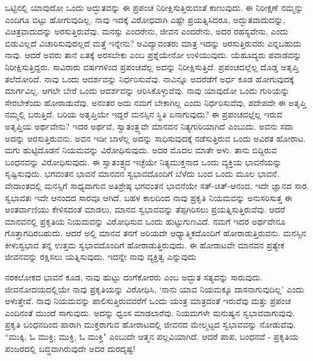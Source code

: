 ಒಟ್ಟಿನಲ್ಲಿ ಯಾವುದೋ ಒಂದು ಅದ್ಭುತವನ್ನು ಈ ಪ್ರಪಂಚ ನಿರೀಕ್ಷಿಸುತ್ತಿರುವಂತೆ ಕಾಣುವುದು. ಈ ನಿರೀಕ್ಷಣೆ ನಮ್ಮನ್ನು ಎಂದಿಗೂ ಬಿಟ್ಟು ಹೋಗುವುದಿಲ್ಲ. ನಾವು ಇದಕ್ಕೆ ವಿರೋಧವಾಗಿ ಎಷ್ಟೇ ಪ್ರಯತ್ನಿಸಿದರೂ, ಅದ್ಭುತವಾದುದನ್ನು, ವಿಚಿತ್ರವಾದುದನ್ನು ಅರಸುತ್ತಿರುವೆವು. ಮನಸ್ಸು ಎಂದರೇನು, ಜೀವನ ಎಂದರೇನು, ಅದರ ರಹಸ್ಯವೇನು, ಎಂದು ಬಿಡುವಿಲ್ಲದೆ ವಿಚಾರಿಸುವುದಲ್ಲದೆ ಮತ್ತೆ ಇನ್ನೇನು? ಅವಿದ್ಯಾವಂತರು ಮಾತ್ರ ಇದನ್ನು ಅರಸುತ್ತಿರುವರು ಎನ್ನಬಹುದು ನಾವು. ಆದರೆ ಅವರು ತಾನೆ ಏತಕ್ಕೆ ಅರಸಬೇಕು ಎಂಬ ಪ್ರಶ್ನೆಯೇನೋ ಉಳಿಯುವುದು. ಯೆಹೂದ್ಯರು ಪವಾಡವನ್ನು ನಿರೀಕ್ಷಿಸುತ್ತಿದ್ದರು. ಸಾವಿರಾರು ವರ್ಷಗಳಿಂದ ಪ್ರಪಂಚವೆಲ್ಲ ಅದನ್ನು ನಿರೀಕ್ಷಿಸುತ್ತಿದೆ. ಪ್ರಪಂಚದಲ್ಲೆಲ್ಲ ದೊಡ್ಡ ಅತೃಪ್ತಿ ತಲೆದೋರಿದೆ. ನಾವು ಒಂದು ಆದರ್ಶವನ್ನು ನಿರ್ಧರಿಸುವೆವು. ನಾವಿನ್ನೂ ಅದರೆಡೆಗೆ ಅರ್ಧ ಕೂಡ ಹೋಗುವುದಕ್ಕೆ ಮಾರ್ಗವಿಲ್ಲ. ಆಗಲೇ ಬೇರೆ ಒಂದು ಆದರ್ಶವನ್ನು ಆರಿಸಿಕೊಳ್ಳುವೆವು. ನಾವು ಯಾವುದೋ ಒಂದು ಗುರಿಯನ್ನು ಸೇರಬೇಕೆಂದು ಹೋರಾಡುವೆವು. ಅನಂತರ ಅದು ನಮಗೆ ಬೇಕಾಗಿಲ್ಲ ಎಂದು ನಿರ್ಧರಿಸುವೆವು, ಪದೇಪದೇ ಈ ಅತೃಪ್ತಿ ನಮ್ಮಲ್ಲಿ ಬರುತ್ತಿದೆ. ಬರಿಯ ಅತೃಪ್ತಿಯೇ ಇದ್ದರೆ ಮನಸ್ಸಿನ ಸ್ಥಿತಿ ಏನಾಗುವುದು? ಈ ಪ್ರಪಂಚದಲ್ಲೆಲ್ಲ ಇರುವ ಅತೃಪ್ತಿಯ ಅರ್ಥವೇನು? ಇದರ ಅರ್ಥವೆ, ಸ್ವಾತಂತ್ರ್ಯವೇ ಮಾನವನ ನಿತ್ಯಗುರಿಯಾಗಿದೆ ಎಂಬುದು. ಅವನು ಸದಾ ಅದನ್ನು ಅರಸುತ್ತಿರುವನು. ಅವನ ಇಡೀ ಬಾಳೆಲ್ಲ ಅದನ್ನು ಸಾಧಿಸುವುದಕ್ಕೆ ನಡೆಸುತ್ತಿರುವ ಒಂದು ಅವಿರತ ಹೋರಾಟ. ಮಗು ಹುಟ್ಟಿದೊಡನೆ ನಿಯಮವನ್ನು ವಿರೋಧಿಸುವುದು. ಅದರ ಮೊದಲ ಮಾತೇ ಅಳು. ತಾನು ಬಿದ್ದಿರುವ ಬಂಧನವನ್ನು ವಿರೋಧಿಸುವುದು. ಈ ಸ್ವಾತಂತ್ರ್ಯದ ಇಚ್ಛೆಯೇ ನಿತ್ಯಮುಕ್ತನಾದ ಒಂದು ವ್ಯಕ್ತಿಯ ಭಾವನೆಯನ್ನು ಸೃಷ್ಟಿಸುವುದು. ಭಗವಂತನ ಭಾವನೆ ಮಾನವನ ಸ್ವಭಾವದೊಂದಿಗೆ ಬೆಳೆದು ಬಂದ ಒಂದು ಮೂಲ ಭಾವನೆ. ವೇದಾಂತದಲ್ಲಿ ಮನಸ್ಸಿಗೆ ಸಾಧ್ಯವಾಗುವ ಅತಿಶ್ರೇಷ್ಠ ಭಗವಂತನ ಭಾವನೆಯೇ ಸತ್-ಚಿತ್-ಆನಂದ, ಇದೇ ಜ್ಞಾನದ ಸಾರ. ಸ್ವಭಾವತಃ ಇದೇ ಆನಂದದ ಸಾರವೂ ಆಗಿದೆ. ಬಹಳ ಕಾಲದಿಂದ ನಾವು ಪ್ರಕೃತಿ ನಿಯಮವನ್ನು ಅನುಸರಿಸುತ್ತ ಈ ಅಂತರ್ವಾಣಿಯು ಕೇಳಿಸದಂತೆ ಮಾಡಲು, ಮಾನವ ಸ್ವಭಾವವನ್ನು ತೆಪ್ಪಗಿರಿಸಲು ಪ್ರಯತ್ನಿಸುತ್ತಿರುವೆವು. ಆದರೆ ಮಾನವನಲ್ಲಿ ಪ್ರಕೃತಿಯ ನಿಯಮವನ್ನು ವಿರೋಧಿಸುವ ಒಂದು ಹುಟ್ಟುಗುಣವಿದೆ. ನಮಗೆ ಇದರ ಅರ್ಥವೇನೂ ಗೊತ್ತಾಗದಿರಬಹುದು. ಆದರೆ ಅಲ್ಲಿ ಮಾನವ ತನಗೆ ಅರಿಯದೇ ಆಧ್ಯಾತ್ಮಿಕದೊಂದಿಗೆ ಹೋರಾಡುತ್ತಿರುವನು. ಮನಸ್ಸಿನ ಕೀಳುಸ್ವಭಾವ ತನ್ನ ಉತ್ತಮ ಸ್ವಭಾವದೊಂದಿಗೆ ಹೋರಾಡುತ್ತಿರುವುದು. ಈ ಹೋರಾಟವೇ ಮಾನವನ ಪ್ರತ್ಯೇಕ ಜೀವನವನ್ನು ರಕ್ಷಿಸಲು ಯತ್ನಿಸುವುದು. ಇದನ್ನೇ ನಾವು ವ್ಯಕ್ತಿತ್ವ ಎನ್ನುವುದು

ನರಕಲೋಕದ ಭಾವನೆ ಕೂಡ, ನಾವು ಹುಟ್ಟು ದಂಗೆಕೋರರು ಎಂಬ ಅದ್ಭುತ ಸತ್ಯವನ್ನು ಸಾರುವುದು. ಜೀವನೋದಯದಲ್ಲಿಯೇ ನಾವು ಪ್ರಕೃತಿಯನ್ನು ವಿರೋಧಿಸಿ, `ನಾನು ಯಾವ ನಿಯಮಕ್ಕೂ ದಾಸನಾಗುವುದಿಲ್ಲ' ಎಂದು ಅಳುತ್ತೇವೆ. ನಾವು ನಿಯಮವನ್ನು ಪಾಲಿಸುತ್ತಿರುವವರೆಗೆ ಒಂದು ಯಂತ್ರ ಮಾತ್ರದಂತೆ ಇರುವೆವು ಮತ್ತು ಪ್ರಪಂಚ ಎಂದಿನಂತೆ ಮುಂದೆ ಸಾಗುವುದು. ಅದನ್ನು ಧ್ವಂಸ ಮಾಡಲಾರೆವು. ನಿಯಮಗಳೇ ಮನುಷ್ಯನ ಸ್ವಭಾವವಾಗುವುವು. ಪ್ರಕೃತಿ ಬಂಧನದಿಂದ ಪಾರಾಗಿ ಮುಕ್ತರಾಗುವ ಹೋರಾಟದಲ್ಲಿ ಜೀವನದ ಮೇಲ್ಮಟ್ಟದ ಸ್ವಭಾವವನ್ನು ನೋಡುವೆವು. “ಮುಕ್ಕಿ, ಓ ಮುಕ್ತಿ; ಮುಕ್ತಿ, ಓ ಮುಕ್ತಿ" ಎಂಬುದೇ ಆತ್ಮನ ಪಲ್ಲವಿಯಾಗಿದೆ. ಆದರೆ ಪಾಪ, ಬಂಧನವೆ - ಪ್ರಕೃತಿಯ ಪಂಜರದಲ್ಲಿ ಬದ್ಧವಾಗಿರುವುದೇ ಅದರ ದುರದೃಷ್ಟ!

